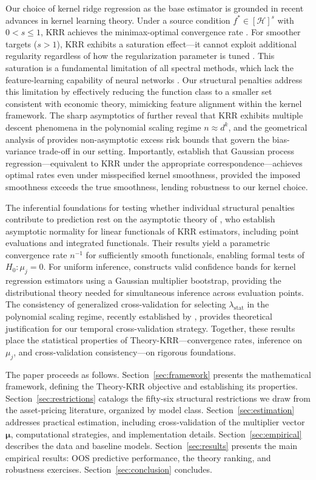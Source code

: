 Our choice of kernel ridge regression as the base estimator is grounded in recent advances in kernel learning theory. Under a source condition $f^* \in [\mathcal{H}]^s$ with $0 < s \leq 1$, KRR achieves the minimax-optimal convergence rate \citep{zhang2025optimal}. For smoother targets ($s > 1$), KRR exhibits a saturation effect---it cannot exploit additional regularity regardless of how the regularization parameter is tuned \citep{li2023saturation}. This saturation is a fundamental limitation of all spectral methods, which lack the feature-learning capability of neural networks \citep{barzilai2024spectral}. Our structural penalties address this limitation by effectively reducing the function class to a smaller set consistent with economic theory, mimicking feature alignment within the kernel framework. The sharp asymptotics of \citet{hu2022sharp} further reveal that KRR exhibits multiple descent phenomena in the polynomial scaling regime $n \approx d^k$, and the geometrical analysis of \citet{zhang2024geometrical} provides non-asymptotic excess risk bounds that govern the bias-variance trade-off in our setting. Importantly, \citet{wang2022gaussian} establish that Gaussian process regression---equivalent to KRR under the appropriate correspondence---achieves optimal rates even under misspecified kernel smoothness, provided the imposed smoothness exceeds the true smoothness, lending robustness to our kernel choice.

The inferential foundations for testing whether individual structural penalties contribute to prediction rest on the asymptotic theory of \citet{fischer2024asymptotic}, who establish asymptotic normality for linear functionals of KRR estimators, including point evaluations and integrated functionals. Their results yield a parametric convergence rate $n^{-1}$ for sufficiently smooth functionals, enabling formal tests of $H_0: \mu_j = 0$. For uniform inference, \citet{singh2024kernel} constructs valid confidence bands for kernel regression estimators using a Gaussian multiplier bootstrap, providing the distributional theory needed for simultaneous inference across evaluation points. The consistency of generalized cross-validation for selecting $\lambda_{\mathrm{stat}}$ in the polynomial scaling regime, recently established by \citet{zhang2024quadratic}, provides theoretical justification for our temporal cross-validation strategy. Together, these results place the statistical properties of Theory-KRR---convergence rates, inference on $\mu_j$, and cross-validation consistency---on rigorous foundations.

The paper proceeds as follows. Section~\ref{sec:framework} presents the mathematical framework, defining the Theory-KRR objective and establishing its properties. Section~\ref{sec:restrictions} catalogs the fifty-six structural restrictions we draw from the asset-pricing literature, organized by model class. Section~\ref{sec:estimation} addresses practical estimation, including cross-validation of the multiplier vector~$\bm{\mu}$, computational strategies, and implementation details. Section~\ref{sec:empirical} describes the data and baseline models. Section~\ref{sec:results} presents the main empirical results: OOS predictive performance, the theory ranking, and robustness exercises. Section~\ref{sec:conclusion} concludes.
